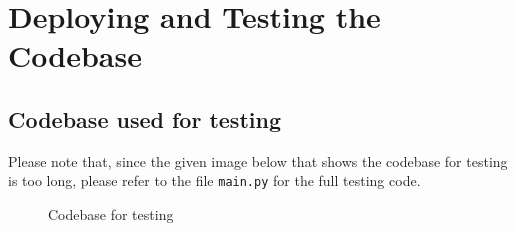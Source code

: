\documentclass[11pt]{article}
\begin{document}
\section{Deploying and Testing the Codebase}

\subsection{Codebase used for testing}
Please note that, since the given image below that shows the codebase for testing is too long, please refer to the file \texttt{main.py} for the full testing code.

\begin{figure}[h]
    \centering
    \caption{Codebase for testing}
    \label{fig:testing_code}
\end{figure}



\end{document}
